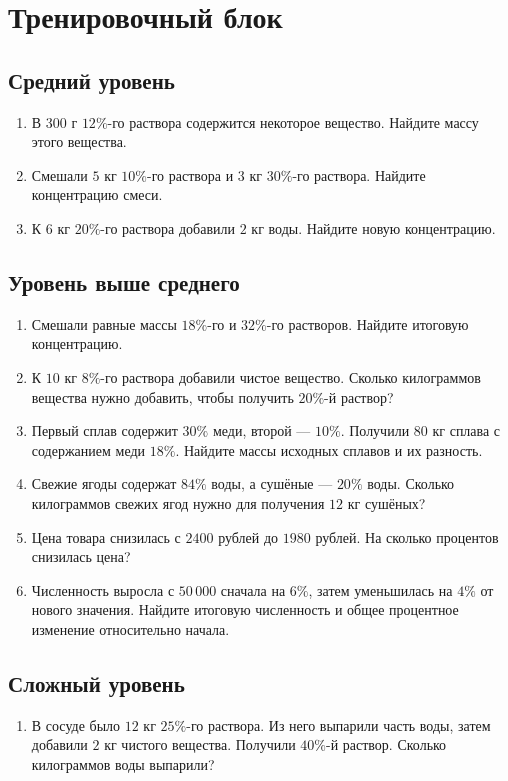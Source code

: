 \documentclass[a4paper,12pt]{article}
\begin{document}
\newpage
\section*{Тренировочный блок}

\subsection*{Средний уровень}
\begin{enumerate}[leftmargin=8mm]
  \item В $300$ г $12\%$-го раствора содержится некоторое вещество.
        Найдите массу этого вещества.
  \item Смешали $5$ кг $10\%$-го раствора и $3$ кг $30\%$-го раствора.
        Найдите концентрацию смеси.
  \item К $6$ кг $20\%$-го раствора добавили $2$ кг воды.
        Найдите новую концентрацию.
\end{enumerate}

\subsection*{Уровень выше среднего}
\begin{enumerate}[leftmargin=8mm,start=4]
  \item Смешали равные массы $18\%$-го и $32\%$-го растворов.
        Найдите итоговую концентрацию.
  \item К $10$ кг $8\%$-го раствора добавили чистое вещество.
        Сколько килограммов вещества нужно добавить, чтобы получить
        $20\%$-й раствор?
  \item Первый сплав содержит $30\%$ меди, второй --- $10\%$.
        Получили $80$ кг сплава с содержанием меди $18\%$.
        Найдите массы исходных сплавов и их разность.
  \item Свежие ягоды содержат $84\%$ воды, а сушёные --- $20\%$ воды.
        Сколько килограммов свежих ягод нужно для получения $12$ кг сушёных?
  \item Цена товара снизилась с $2400$ рублей до $1980$ рублей.
        На сколько процентов снизилась цена?
  \item Численность выросла с $50\,000$ сначала на $6\%$, затем
        уменьшилась на $4\%$ от нового значения. Найдите итоговую численность
        и общее процентное изменение относительно начала.
\end{enumerate}

\subsection*{Сложный уровень}
\begin{enumerate}[leftmargin=8mm,start=10]
  \item В сосуде было $12$ кг $25\%$-го раствора. Из него выпарили часть
        воды, затем добавили $2$ кг чистого вещества. Получили $40\%$-й
        раствор. Сколько килограммов воды выпарили?
\end{enumerate}
\end{document}
